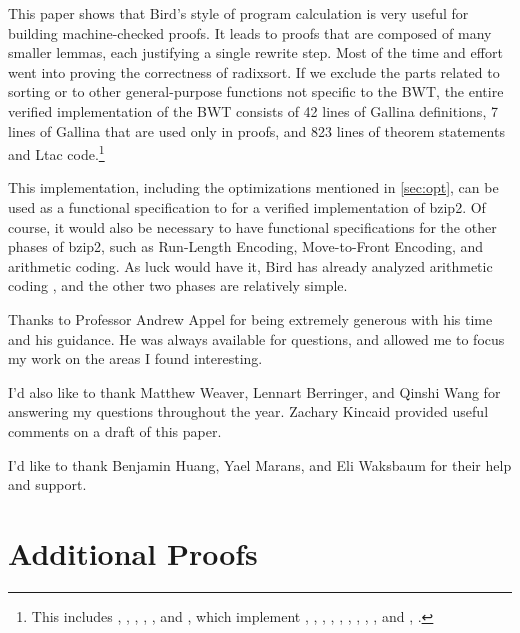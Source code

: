 \documentclass[sigplan,10pt,anonymous,review]{thesis}
\begin{document}
This paper shows that Bird's style of program calculation is very
useful for building machine-checked proofs. It leads to proofs that
are composed of many smaller lemmas, each justifying a single rewrite
step. Most of the time and effort went into proving the correctness of
radixsort. If we exclude the parts related to sorting or to other
general-purpose functions not specific to the BWT, the entire verified
implementation of the BWT consists of 42 lines of Gallina definitions,
7 lines of Gallina that are used only in proofs, and 823 lines of
theorem statements and Ltac code.\footnote{This includes
  , , ,
  , ,  and
  , which implement , ,
  , , , , ,
  , , and , .}

This implementation, including the optimizations mentioned in
\cref{sec:opt}, can be used as a functional specification to for a
verified implementation of bzip2. Of course, it would also be
necessary to have functional specifications for the other phases of
bzip2, such as Run-Length Encoding, Move-to-Front Encoding, and
arithmetic coding. As luck would have it, Bird has already analyzed
arithmetic coding \cite{pearls}, and the other two phases are
relatively simple.

\begin{acks}
  Thanks to Professor Andrew Appel for being extremely generous with his
  time and his guidance. He was always available for questions, and
  allowed me to focus my work on the areas I found interesting.

  I'd also like to thank Matthew Weaver, Lennart Berringer, and Qinshi
  Wang for answering my questions throughout the year. Zachary Kincaid
  provided useful comments on a draft of this paper.

  I'd like to thank Benjamin Huang, Yael Marans, and Eli Waksbaum for
  their help and support.
\end{acks}



\appendix

\section{Additional Proofs}
\label{appendix:proofs}
\end{document}
